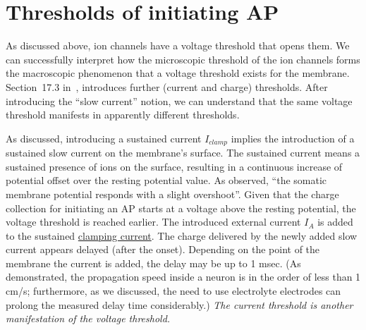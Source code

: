 \section{Thresholds of initiating AP\label{sec:Physiology-FallaciesAPThresholds}}

As discussed above, ion channels have a voltage threshold that opens
them. We can successfully interpret how the microscopic threshold
of the ion channels forms the macroscopic phenomenon that a voltage
threshold exists for the membrane. Section~17.3 in~\cite{KochBiophysics:1999},
introduces further (current and charge) thresholds. After introducing
the ``slow current'' notion, we can understand that the same voltage
threshold manifests in apparently different thresholds.

As discussed, introducing a sustained current $I_{clamp}$
implies the introduction of a sustained slow current on the membrane's
surface. The sustained current means a sustained presence of ions on the surface, resulting in a continuous increase of potential offset over the resting potential value. As observed, ``the somatic membrane
potential responds with a slight overshoot''. Given that the charge
collection for initiating an 
AP starts at a voltage above the
resting potential, the voltage threshold is reached earlier. The introduced
external current $I_{A}$ is added to the sustained \hyperlink{voltage-clamping}{clamping current}.
The charge delivered by the newly added slow current appears delayed
(after the onset). Depending on the point of the membrane the current
is added, the delay may be up to 1 msec. (As \cite{ActionPotentialGenerationNatrium:2008}
demonstrated, the propagation speed inside a neuron is in the order
of less than 1 cm/s; furthermore, as we discussed, the need to use
electrolyte electrodes can prolong the measured delay time considerably.)
\emph{The current threshold is another manifestation of the voltage
	threshold.}

